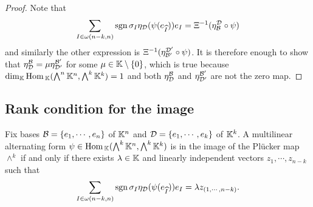 \begin{proof}
Note that
\[\sum_{I\in\omega(n-k,n)}\mathrm{sgn}\,\sigma_I\eta_{\mathcal{D}}(\psi(e_{\widehat{I}}))e_I=\Xi^{-1}(\eta^{\mathcal{D}}_{\mathcal{B}}\circ \psi)\]
and similarly the other expression is $\Xi^{-1}(\eta^{\mathcal{D}'}_{\mathcal{B}'}\circ \psi)$. 
It is therefore enough to show that $\eta^{\mathcal{B}}_{\mathcal{D}}=\mu\eta^{\mathcal{B}'}_{\mathcal{D}'}$ for some $\mu\in \mathbb{K}\setminus\{0\}$, which is true because $\dim_{\mathbb{K}}\mathrm{Hom}\,_{\mathbb{K}}(\bigwedge^n\mathbb{K}^n,\bigwedge^k\mathbb{K}^k)=1$ and both $\eta^{\mathcal{B}}_{\mathcal{D}}$ and $\eta^{\mathcal{B}'}_{\mathcal{D}'}$ are not the zero map.
\end{proof}

\subsection{Rank condition for the image}
\begin{lemma}\label{DecomposabilityOfMultilinearForm}
Fix bases $\mathcal{B}=\left\{{e_1,\cdots, e_n}\right\}$ of $\mathbb{K}^n$ and $\mathcal{D}=\left\{{e_1,\cdots, e_k}\right\}$ of $\mathbb{K}^k$. A multilinear alternating form $\psi\in \mathrm{Hom}\,_{\mathbb{K}}(\bigwedge^k\mathbb{K}^n,\bigwedge^k\mathbb{K}^k)$ is in the image of the Pl\"ucker map $\wedge^k$ if and only if there exists $\lambda\in\mathbb{K}$ and linearly independent vectors $z_1,\cdots,z_{n-k}$ such that
\[\sum_{I\in \omega(n-k,n)}\mathrm{sgn}\,\sigma_I\eta_{\mathcal{D}}(\psi(e_{\widehat{I}}))e_I=\lambda z_{(1,\cdots, n-k)}.\]
\end{lemma}
